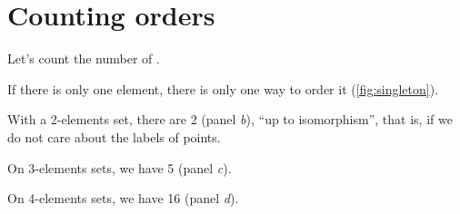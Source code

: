 \section{Counting orders}


Let's count the number of .

If there is only one element, there is only one way to order it (\cref{fig:singleton}).

With a 2-elements set, there are 2  (panel \emph{b}), ``up to isomorphism'',
that is, if we do not care about the labels of points.

On 3-elements sets, we have 5  (panel \emph{c}).

On 4-elements sets, we have 16  (panel \emph{d}).

\vfill

